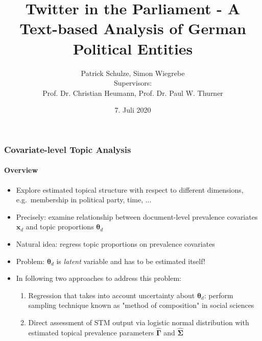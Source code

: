 \documentclass[xcolor=dvipsnames]{beamer}
\title{Twitter in the Parliament - A Text-based Analysis of German Political Entities}
\date{7. Juli 2020}
\author[author1]{Patrick Schulze, Simon Wiegrebe\\[10mm]{\small Supervisors:\\ Prof. Dr. Christian Heumann, Prof. Dr. Paul W. Thurner}}
\begin{document}
\begin{frame}
\titlepage
\end{frame}


\begin{frame}
\frametitle{Covariate-level Topic Analysis}
\framesubtitle{Overview}
\begin{itemize}
\item Explore estimated topical structure with respect to different dimensions, e.g.\ membership in political party, time, $\dots$
\item Precisely: examine relationship between document-level prevalence covariates $\boldsymbol{x}_d$ and topic proportions $\boldsymbol{\theta}_d$
\item Natural idea: regress topic proportions on prevalence covariates
\item Problem: $\boldsymbol{\theta}_d$ is \textit{latent} variable and has to be estimated itself!
\item In following two approaches to address this problem:
\begin{enumerate}
\item Regression that takes into account uncertainty about $\boldsymbol{\theta}_d$: perform sampling technique known as "method of composition" in social sciences
\item Direct assessment of STM output via logistic normal distribution with estimated topical prevalence parameters $\hat{\boldsymbol{\Gamma}}$ and $\hat{\boldsymbol{\Sigma}}$
\end{enumerate}
\end{itemize}
\end{frame}
\end{document}
